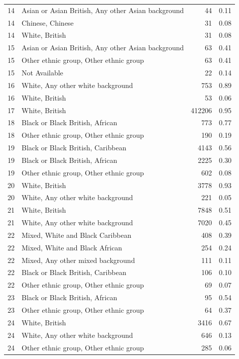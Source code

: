 \begin{table}[ht]
{\begin{tabular}[t]{rlrr}
   14 & Asian or Asian British, Any other Asian background &  44 & 0.11 \\ 
   14 & Chinese, Chinese &  31 & 0.08 \\ 
   14 & White, British &  31 & 0.08 \\ 
   15 & Asian or Asian British, Any other Asian background &  63 & 0.41 \\ 
   15 & Other ethnic group, Other ethnic group &  63 & 0.41 \\ 
   15 & Not Available &  22 & 0.14 \\ 
   16 & White, Any other white background & 753 & 0.89 \\ 
   16 & White, British &  53 & 0.06 \\ 
   17 & White, British & 412206 & 0.95 \\ 
   18 & Black or Black British, African & 773 & 0.77 \\ 
   18 & Other ethnic group, Other ethnic group & 190 & 0.19 \\ 
   19 & Black or Black British, Caribbean & 4143 & 0.56 \\ 
   19 & Black or Black British, African & 2225 & 0.30 \\ 
   19 & Other ethnic group, Other ethnic group & 602 & 0.08 \\ 
   20 & White, British & 3778 & 0.93 \\ 
   20 & White, Any other white background & 221 & 0.05 \\ 
   21 & White, British & 7848 & 0.51 \\ 
   21 & White, Any other white background & 7020 & 0.45 \\ 
   22 & Mixed, White and Black Caribbean & 408 & 0.39 \\ 
   22 & Mixed, White and Black African & 254 & 0.24 \\ 
   22 & Mixed, Any other mixed background & 111 & 0.11 \\ 
   22 & Black or Black British, Caribbean & 106 & 0.10 \\ 
   22 & Other ethnic group, Other ethnic group &  69 & 0.07 \\ 
   23 & Black or Black British, African &  95 & 0.54 \\ 
   23 & Other ethnic group, Other ethnic group &  64 & 0.37 \\ 
   24 & White, British & 3416 & 0.67 \\ 
   24 & White, Any other white background & 646 & 0.13 \\ 
   24 & Other ethnic group, Other ethnic group & 285 & 0.06 \\ 

\end{tabular}}
\end{table}
